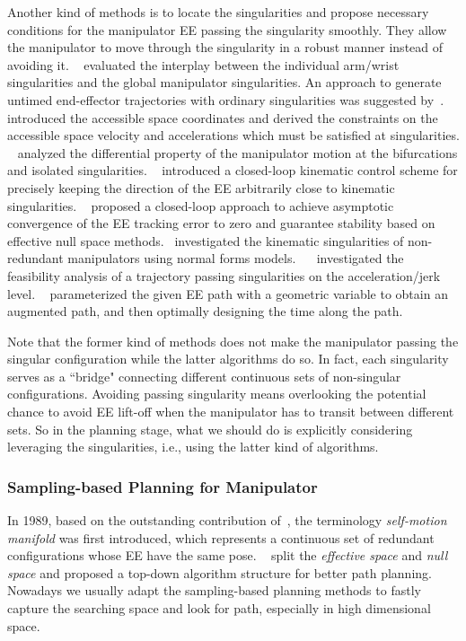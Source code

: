 \documentclass[Afour,sageh,times]{sagej}
\begin{document}
Another kind of methods is to locate the singularities and propose necessary conditions for the manipulator EE passing the singularity smoothly. They allow the manipulator to move through the singularity in a robust manner instead of avoiding it.
~\cite{Vassilios1992Identification} evaluated the interplay between the individual arm/wrist singularities and the global manipulator singularities. 
An approach to generate untimed end-effector trajectories with ordinary singularities was suggested by~\cite{Kieffer1992Manipulator}.
~\cite{Singh1993Motion} introduced the accessible space coordinates and derived the constraints on the accessible space velocity and accelerations which must be satisfied at singularities.
~\cite{Kieffer1994Differential} analyzed the differential property of the manipulator motion at the bifurcations and isolated singularities.
~\cite{Nenchev1995Singularity} introduced a closed-loop kinematic control scheme for precisely keeping the direction of the EE arbitrarily close to kinematic singularities.
~\cite{Dragomir1995Tracking} proposed a closed-loop approach to achieve asymptotic convergence of the EE tracking error to zero and guarantee stability based on effective null space methods.~\cite{Krzysztop1997Singularities} investigated the kinematic singularities of non-redundant manipulators using normal forms models.
~\cite{Neil1997Removing}~\cite{Chevallereau1998Feasible} investigated the feasibility analysis of a trajectory passing singularities on the acceleration/jerk level.
~\cite{Guangyu2006Optimal} parameterized the given EE path with a geometric variable to obtain an augmented path, and then optimally designing the time along the path. 

Note that the former kind of methods does not make the manipulator passing the singular configuration while the latter algorithms do so. In fact, each singularity serves as a ``bridge" connecting different continuous sets of non-singular configurations. Avoiding passing singularity means overlooking the potential chance to avoid EE lift-off when the manipulator has to transit between different sets. 
So in the planning stage, what we should do is explicitly considering leveraging the singularities, i.e., using the latter kind of algorithms.

\subsubsection{Sampling-based Planning for Manipulator}
In 1989, based on the outstanding contribution of~\cite{Burdick1989On}, the terminology \textit{self-motion manifold} was first introduced, which represents a continuous set of redundant configurations whose EE have the same pose. 
~\cite{Luck1994Global} split the \textit{effective space} and \textit{null space} and proposed a top-down algorithm structure for better path planning. 
Nowadays we usually adapt the sampling-based planning methods to fastly capture the searching space and look for path, especially in high dimensional space. 
\end{document}
